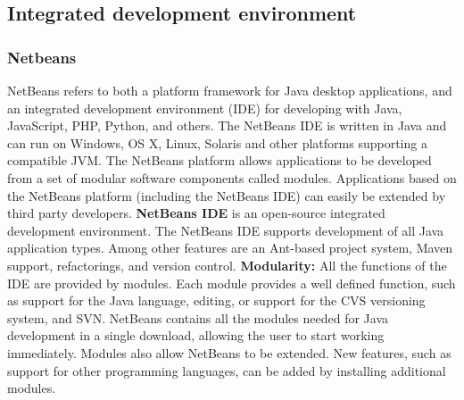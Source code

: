 \subsection{Integrated development environment}

\subsubsection{Netbeans}
NetBeans refers to both a platform framework for Java desktop applications, and an integrated development environment (IDE) for developing with Java, JavaScript, PHP, Python, and others.
The NetBeans IDE is written in Java and can run on Windows, OS X, Linux, Solaris and other platforms supporting a compatible JVM. 
\newline
\newline
The NetBeans platform allows applications to be developed from a set of modular software components called modules. Applications based on the NetBeans platform (including the NetBeans IDE) can easily be extended by third party developers.
\newline
\newline
\textbf{NetBeans IDE} is an open-source integrated development environment. The NetBeans IDE supports development of all Java application types. Among other features are an Ant-based project system, Maven support, refactorings, and version control.
\textbf{Modularity:} All the functions of the IDE are provided by modules. Each module provides a well defined function, such as support for the Java language, editing, or support for the CVS versioning system, and SVN. NetBeans contains all the modules needed for Java development in a single download, allowing the user to start working immediately. Modules also allow NetBeans to be extended. New features, such as support for other programming languages, can be added by installing additional modules.